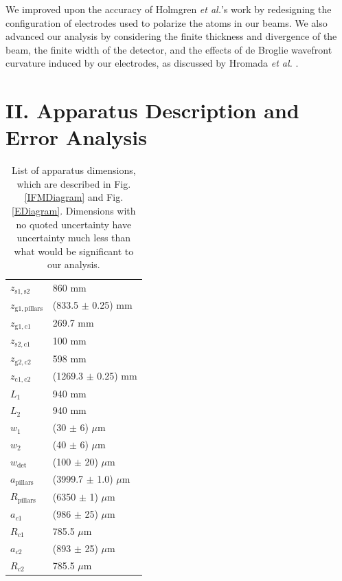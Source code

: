 \documentclass[twocolumn,prl,showpacs,superscriptaddress]{revtex4-1}   %
\newcommand{\figref}[1]{Fig. \ref{#1}}
\newcommand{\etal}{\textit{et al.}}
\newcommand{\etalspace}{\textit{et al. }}
\begin{document}
We improved upon the accuracy of Holmgren \etal's work by redesigning the configuration of electrodes used to polarize the atoms in our beams. We also advanced our analysis by considering the finite thickness and divergence of the beam, the finite width of the detector, and the effects of de Broglie wavefront curvature induced by our electrodes, as discussed by Hromada \etalspace \cite{Hromada2014}.


\section{II. Apparatus Description and Error Analysis}

\begingroup
\begin{table}
\caption{\label{tableDimensions}List of apparatus dimensions, which are described in \figref{IFMDiagram} and \figref{EDiagram}. Dimensions with no quoted uncertainty have uncertainty much less than what would be significant to our analysis.}
\begin{center}
\begin{tabular}{l l}
\hline\hline
$z_{\mathrm{s1,s2}}$ & 860 mm \\
$z_{\mathrm{g1,pillars}}$ & (833.5 $\pm$ 0.25) mm \\
$z_{\mathrm{g1,c1}}$ & 269.7 mm \\
$z_{\mathrm{s2,c1}}$ & 100 mm \\
$z_{\mathrm{g2,c2}}$ & 598 mm \\
$z_{\mathrm{c1,c2}}$ & (1269.3 $\pm$ 0.25) mm \\
$L_1$ & 940 mm \\
$L_2$ & 940 mm \\
$w_1$ & (30 $\pm$ 6) $\mu$m \\
$w_2$ & (40 $\pm$ 6) $\mu$m \\
$w_{\mathrm{det}}$ & (100 $\pm$ 20) $\mu$m \\ 
$a_{\mathrm{pillars}}$ & (3999.7 $\pm$ 1.0) $\mu$m \\
$R_{\mathrm{pillars}}$ & (6350 $\pm$ 1) $\mu$m \\
$a_{c1}$ & (986 $\pm$ 25) $\mu$m \\
$R_{c1}$ & 785.5 $\mu$m \\
$a_{c2}$ & (893 $\pm$ 25) $\mu$m \\
$R_{c2}$ & 785.5 $\mu$m \\
\hline\hline
\end{tabular}
\end{center}
\end{table}
\endgroup
\end{document}
